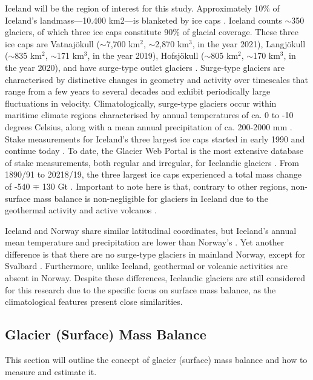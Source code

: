 Iceland will be the region of interest for this study. Approximately 10\% of Iceland's landmass—10.400 km2—is blanketed by ice caps \cite{bjornsson-2016}. Iceland counts $\sim$350 glaciers, of which three ice caps constitute 90\% of glacial coverage. These three ice caps are Vatnajökull ($\sim$7,700 km$^2$, $\sim$2,870 km$^3$, in the year 2021), Langjökull ($\sim$835 km$^2$, $\sim$171 km$^3$, in the year 2019), Hofsjökull ($\sim$805 km$^2$, $\sim$170 km$^3$, in the year 2020), and have surge-type outlet glaciers \cite{aalgeirsdottir-2020}. Surge-type glaciers are characterised by distinctive changes in geometry and activity over timescales that range from a few years to several decades and exhibit periodically large fluctuations in velocity. Climatologically, surge-type glaciers occur within maritime climate regions characterised by annual temperatures of ca. 0 to -10 degrees Celsius, along with a mean annual precipitation of ca. 200-2000 mm \cite{ingolfsson-2016}. Stake measurements for Iceland's three largest ice caps started in early 1990 and continue today \cite{bjornsson-2016}. To date, the Glacier Web Portal is the most extensive database of stake measurements, both regular and irregular, for Icelandic glaciers \cite{glacierwebportal}. From 1890/91 to 20218/19, the three largest ice caps experienced a total mass change of -540 $\mp$ 130 Gt \cite{aalgeirsdottir-2020}. Important to note here is that, contrary to other regions, non-surface mass balance is non-negligible for glaciers in Iceland due to the geothermal activity and active volcanos \cite{jhannesson-2020}. 

Iceland and Norway share similar latitudinal coordinates, but Iceland's annual mean temperature and precipitation are lower than Norway's \cite{orsteinsson-2013}. Yet another difference is that there are no surge-type glaciers in mainland Norway, except for Svalbard \cite{moholdt-2021}. Furthermore, unlike Iceland, geothermal or volcanic activities are absent in Norway. Despite these differences, Icelandic glaciers are still considered for this research due to the specific focus on surface mass balance, as the climatological features present close similarities.

\clearpage
\subsection{Glacier (Surface) Mass Balance}\label{glacier mass balance}
This section will outline the concept of glacier (surface) mass balance and how to measure and estimate it. 

